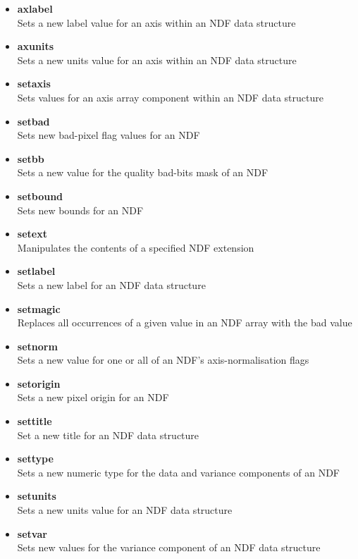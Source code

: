 \documentclass[twoside,11pt]{article}
\newcommand{\xref}[3]{#1}
\begin{document}
\begin{\htmlonly}
{\begin{itemize}
\item{\xref{{\bf axlabel}}{sun95}{AXLABEL}}\\
Sets a new label value for an axis within an NDF data structure 
\item{\xref{{\bf axunits}}{sun95}{AXUNITS}}\\
Sets a new units value for an axis within an NDF data structure 
\item{\xref{{\bf setaxis}}{sun95}{SETAXIS}}\\
Sets values for an axis array component within an NDF data structure 
\item{\xref{{\bf setbad}}{sun95}{SETBAD}}\\
Sets new bad-pixel flag values for an NDF 
\item{\xref{{\bf setbb}}{sun95}{SETBB}}\\
Sets a new value for the quality bad-bits mask of an NDF 
\item{\xref{{\bf setbound}}{sun95}{SETBOUND}}\\
Sets new bounds for an NDF 
\item{\xref{{\bf setext}}{sun95}{SETEXT}}\\
Manipulates the contents of a specified NDF extension 
\item{\xref{{\bf setlabel}}{sun95}{SETLABEL}}\\
Sets a new label for an NDF data structure 
\item{\xref{{\bf setmagic}}{sun95}{SETMAGIC}}\\
Replaces all occurrences of a given value in an NDF array with the bad value 
\item{\xref{{\bf setnorm}}{sun95}{SETNORM}}\\
Sets a new value for one or all of an NDF's axis-normalisation flags 
\item{\xref{{\bf setorigin}}{sun95}{SETORIGIN}}\\
Sets a new pixel origin for an NDF 
\item{\xref{{\bf settitle}}{sun95}{SETTITLE}}\\
Set a new title for an NDF data structure 
\item{\xref{{\bf settype}}{sun95}{SETTYPE}}\\
Sets a new numeric type for the data and variance components of an NDF
\item{\xref{{\bf setunits}}{sun95}{SETUNITS}}\\
Sets a new units value for an NDF data structure 
\item{\xref{{\bf setvar}}{sun95}{SETVAR}}\\
Sets new values for the variance component of an NDF data structure     
\end{itemize}  
  
}
\end{\htmlonly}
\end{document}
